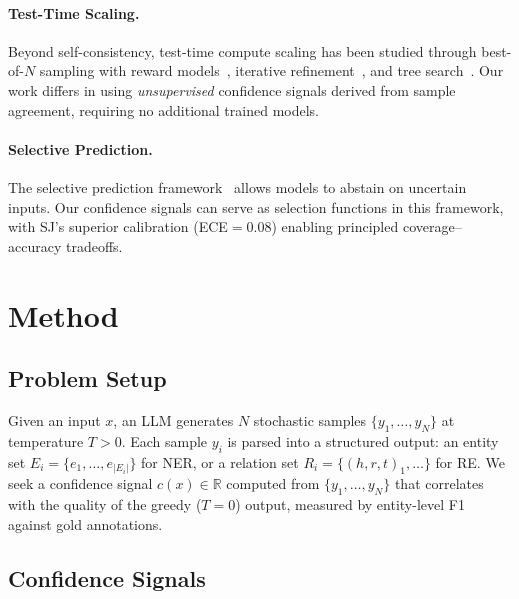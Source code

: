 \documentclass[11pt,a4paper]{article}
\begin{document}
\paragraph{Test-Time Scaling.}
Beyond self-consistency, test-time compute scaling has been studied through best-of-$N$ sampling with reward models~\cite{cobbe2021training,lightman2024lets}, iterative refinement~\cite{madaan2023self}, and tree search~\cite{yao2023tree}. Our work differs in using \emph{unsupervised} confidence signals derived from sample agreement, requiring no additional trained models.

\paragraph{Selective Prediction.}
The selective prediction framework~\cite{geifman2017selective,el2010foundations} allows models to abstain on uncertain inputs. Our confidence signals can serve as selection functions in this framework, with SJ's superior calibration (ECE$=0.08$) enabling principled coverage--accuracy tradeoffs.

\section{Method}
\label{sec:method}

\subsection{Problem Setup}
Given an input $x$, an LLM generates $N$ stochastic samples $\{y_1, \ldots, y_N\}$ at temperature $T > 0$. Each sample $y_i$ is parsed into a structured output: an entity set $E_i = \{e_1, \ldots, e_{|E_i|}\}$ for NER, or a relation set $R_i = \{(h, r, t)_1, \ldots\}$ for RE. We seek a confidence signal $c(x) \in \mathbb{R}$ computed from $\{y_1, \ldots, y_N\}$ that correlates with the quality of the greedy ($T{=}0$) output, measured by entity-level F1 against gold annotations.

\subsection{Confidence Signals}
\end{document}
